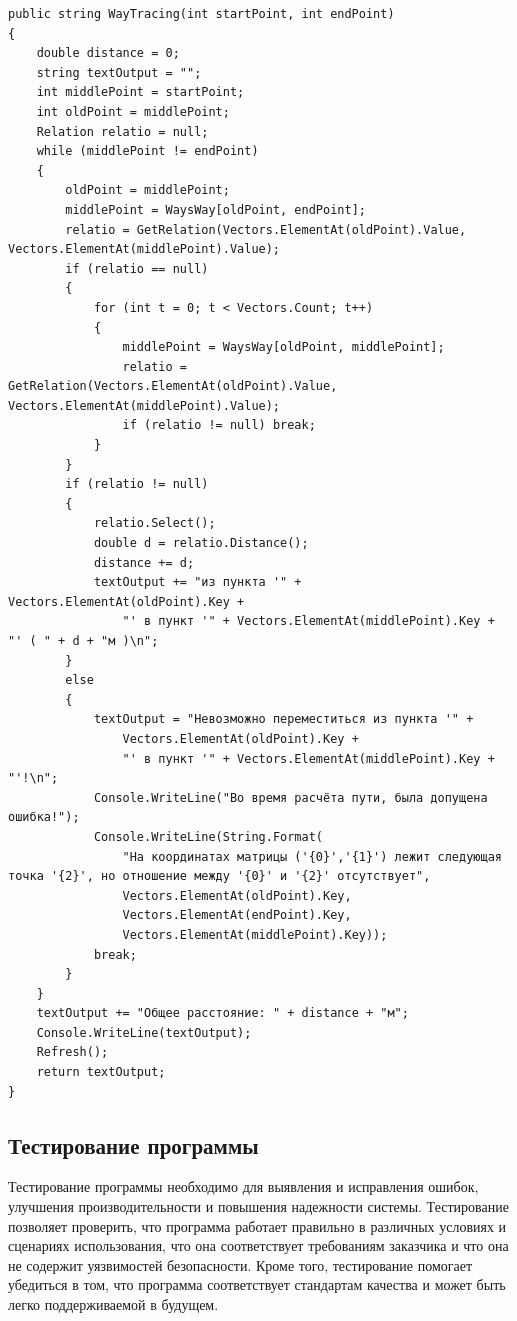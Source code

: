 \documentclass[a4paper,14pt, Times New Roman]{extarticle}
\begin{document}
\begin{lstlisting}
public string WayTracing(int startPoint, int endPoint)
{
    double distance = 0;
    string textOutput = "";
    int middlePoint = startPoint;
    int oldPoint = middlePoint;
    Relation relatio = null;
    while (middlePoint != endPoint)
    {
        oldPoint = middlePoint;
        middlePoint = WaysWay[oldPoint, endPoint];
        relatio = GetRelation(Vectors.ElementAt(oldPoint).Value, Vectors.ElementAt(middlePoint).Value);
        if (relatio == null)
        {
            for (int t = 0; t < Vectors.Count; t++)
            {
                middlePoint = WaysWay[oldPoint, middlePoint];
                relatio = GetRelation(Vectors.ElementAt(oldPoint).Value, Vectors.ElementAt(middlePoint).Value);
                if (relatio != null) break;
            }
        }
        if (relatio != null)
        {
            relatio.Select();
            double d = relatio.Distance();
            distance += d;
            textOutput += "из пункта '" + Vectors.ElementAt(oldPoint).Key +
                "' в пункт '" + Vectors.ElementAt(middlePoint).Key + "' ( " + d + "м )\n";
        }
        else
        {
            textOutput = "Невозможно переместиться из пункта '" + 
                Vectors.ElementAt(oldPoint).Key +
                "' в пункт '" + Vectors.ElementAt(middlePoint).Key + "'!\n";
            Console.WriteLine("Во время расчёта пути, была допущена ошибка!");
            Console.WriteLine(String.Format(
                "На координатах матрицы ('{0}','{1}') лежит следующая точка '{2}', но отношение между '{0}' и '{2}' отсутствует",
                Vectors.ElementAt(oldPoint).Key,
                Vectors.ElementAt(endPoint).Key,
                Vectors.ElementAt(middlePoint).Key));
            break;
        }
    }
    textOutput += "Общее расстояние: " + distance + "м";
    Console.WriteLine(textOutput);
    Refresh();
    return textOutput;
}
\end{lstlisting}


\subsection{Тестирование программы}

Тестирование программы необходимо для выявления и исправления ошибок, улучшения производительности и повышения надежности системы. Тестирование позволяет проверить, что программа работает правильно в различных условиях и сценариях использования, что она соответствует требованиям заказчика и что она не содержит уязвимостей безопасности. Кроме того, тестирование помогает убедиться в том, что программа соответствует стандартам качества и может быть легко поддерживаемой в будущем.
\end{document}
